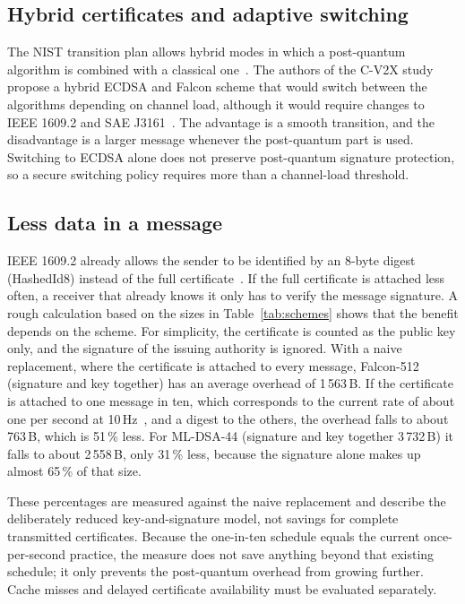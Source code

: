 \documentclass[11pt,a4paper]{article}
\begin{document}
\subsection{Hybrid certificates and adaptive switching}

The NIST transition plan allows hybrid modes in which a post-quantum algorithm is combined with
a classical one~\cite{nistir8547}. The authors of the C-V2X study propose a hybrid ECDSA and
Falcon scheme that would switch between the algorithms depending on channel load, although it
would require changes to IEEE 1609.2 and SAE J3161~\cite{abrar}. The advantage is a smooth
transition, and the disadvantage is a larger message whenever the post-quantum part is used.
Switching to ECDSA alone does not preserve post-quantum signature protection, so a secure
switching policy requires more than a channel-load threshold.

\subsection{Less data in a message}

IEEE 1609.2 already allows the sender to be identified by an 8-byte digest (HashedId8) instead
of the full certificate~\cite{etsi097r1,ieee1609}. If the full certificate is attached less
often, a receiver that already knows it only has to verify the message signature. A rough
calculation based on the sizes in Table~\ref{tab:schemes} shows that the benefit depends on the
scheme. For simplicity, the certificate is counted as the public key only, and the signature of
the issuing authority is ignored. With a naive replacement, where the certificate is attached to
every message, Falcon-512 (signature and key together) has an average overhead of 1\,563\,B. If
the certificate is attached to one message in ten, which corresponds to the current rate of about
one per second at 10\,Hz~\cite{kenney}, and a digest to the others, the overhead falls to about
763\,B, which is 51\,\% less. For ML-DSA-44 (signature and key together 3\,732\,B) it falls to
about 2\,558\,B, only 31\,\% less, because the signature alone makes up almost 65\,\% of that
size.

These percentages are measured against the naive replacement and describe the deliberately
reduced key-and-signature model, not savings for complete transmitted certificates. Because the
one-in-ten schedule equals the current once-per-second practice, the measure does not save
anything beyond that existing schedule; it only prevents the post-quantum overhead from growing
further. Cache misses and delayed certificate availability must be evaluated separately.
\end{document}
